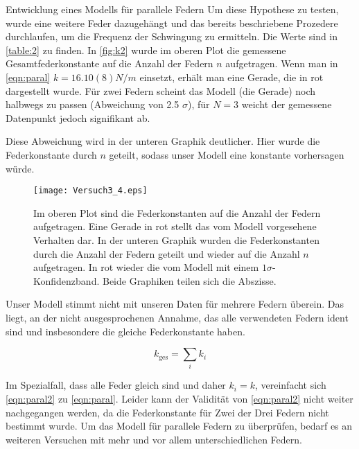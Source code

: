 \documentclass{alex_gp}
\begin{document}
\begin{mybox}{Entwicklung eines Modells für parallele Federn}
	Um diese Hypothese zu testen, wurde eine weitere Feder dazugehängt und das bereits beschriebene Prozedere durchlaufen, um die Frequenz der Schwingung zu ermitteln. Die Werte sind in  \autoref{table:2} zu finden. In \autoref{fig:k2} wurde im oberen Plot die gemessene Gesamtfederkonstante auf die Anzahl der Federn \( n \) aufgetragen. Wenn man in \autoref{eqn:paral} \( k = 16.10(8)  \unit{N/m} \) einsetzt, erhält man eine Gerade, die in rot dargestellt wurde. Für zwei Federn scheint das Modell (die Gerade) noch halbwegs zu passen (Abweichung von 2.5 $\sigma$), für \( N = 3 \) weicht der gemessene Datenpunkt jedoch signifikant ab. 
	
	Diese Abweichung wird in der unteren Graphik deutlicher. Hier wurde die Federkonstante durch \( n \) geteilt, sodass unser Modell eine konstante vorhersagen würde. 
	
	\begin{figure}[H]
		\centering
		\texttt{[image: Versuch3\_4.eps]}
		\caption{Im oberen Plot sind die Federkonstanten auf die Anzahl der Federn aufgetragen. Eine Gerade in rot stellt das vom Modell vorgesehene Verhalten dar. In der unteren Graphik wurden die Federkonstanten durch die Anzahl der Federn geteilt und wieder auf die Anzahl \( n \) aufgetragen. In rot wieder die vom Modell mit einem \( 1\sigma \)-Konfidenzband. Beide Graphiken teilen sich die Abszisse.}
		\label{fig:k2}
	\end{figure}
	
	Unser Modell stimmt nicht mit unseren Daten für mehrere Federn überein. Das liegt, an der nicht ausgesprochenen Annahme, das alle verwendeten Federn ident sind und insbesondere die gleiche Federkonstante haben. 
	
	\begin{equation}\label{eqn:paral2}
		k_{\text{ges}} = \sum_{i} k_i
	\end{equation}

	Im Spezialfall, dass alle Feder gleich sind und daher \( k_i = k \), vereinfacht sich \autoref{eqn:paral2} zu \autoref{eqn:paral}. Leider kann der Validität von \autoref{eqn:paral2} nicht weiter nachgegangen werden, da die Federkonstante für Zwei der Drei Federn nicht bestimmt wurde.
	Um das Modell für parallele Federn zu überprüfen, bedarf es an weiteren Versuchen mit mehr und vor allem unterschiedlichen Federn.

\end{mybox}
\end{document}
